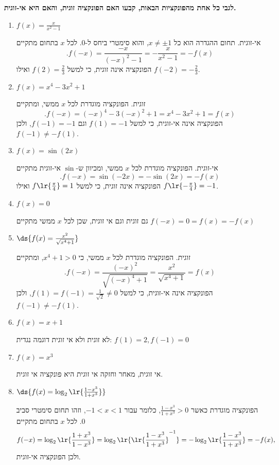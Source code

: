 \textbf{לגבי כל אחת מהפונקציות הבאות, קבעו האם הפונקציה זוגית, והאם היא אי-זוגית.}
\begin{enumerate}
\item $f(x) = \frac{x}{x^2 -1}$
\begin{solbox}
אי-זוגית. תחום ההגדרה הוא כל $x\neq\pm1$, והוא סימטרי ביחס ל-$0$. לכל $x$ בתחום מתקיים
$$.f(-x)=\frac{-x}{(-x)^2-1}=-\frac{x}{x^2-1}=-f(x)$$
הפונקציה אינה זוגית, כי למשל
$f(2)=\frac23$
ואילו
$f(-2)=-\frac23$.
\end{solbox}
\item $f(x) = x^4 - 3x^2 + 1$
\begin{solbox}
זוגית. הפונקציה מוגדרת לכל $x$ ממשי, ומתקיים
$$.f(-x)=(-x)^4-3(-x)^2+1=x^4-3x^2+1=f(x)$$
הפונקציה אינה אי-זוגית, כי למשל
$f(1)=-1$
וגם
$f(-1)=-1$,
ולכן
$f(-1)\neq -f(1)$.
\end{solbox}
\item $f(x) = \sin (2x)$
\begin{solbox}
אי-זוגית. הפונקציה מוגדרת לכל $x$ ממשי, ומכיוון ש-$\sin$ אי-זוגית מתקיים
$$.f(-x)=\sin(-2x)=-\sin(2x)=-f(x)$$
הפונקציה אינה זוגית, כי למשל
$f\lr{\frac\pi4}=1$
ואילו
$f\lr{-\frac\pi4}=-1$.
\end{solbox}
\item $f(x)=0$
\begin{solbox}
גם זוגית וגם אי זוגית, שכן לכל $x$ ממשי מתקיים
$f(-x) = 0 = f(x) = -f(x)$
\end{solbox}
\item  $\ds{f(x)=\frac{x^2}{\sqrt{x^4+1}}}$
\begin{solbox}
זוגית. הפונקציה מוגדרת לכל $x$ ממשי, כי $x^4+1>0$, ומתקיים
$$.f(-x)=\frac{(-x)^2}{\sqrt{(-x)^4+1}}=\frac{x^2}{\sqrt{x^4+1}}=f(x)$$
הפונקציה אינה אי-זוגית, כי למשל
$f(1)=f(-1)=\frac{1}{\sqrt2}\neq0$,
ולכן
$f(-1)\neq-f(1)$.
\end{solbox}
\item  $f(x)=x+1$
\begin{solbox}
לא זוגית ולא אי זוגית דוגמה נגדית:
$f(1)=2 , f(-1)=0$
\end{solbox}
\item  $f(x)=x^3$
\begin{solbox}
אי זוגית,
מאחר וחזקה אי זוגית היא פונקציה אי זוגית.
\end{solbox}
\item  $\ds{f(x)=\log_2\lr{\frac{1-x^3}{1+x^3}}}$
\begin{solbox}
הפונקציה מוגדרת כאשר
$\frac{1-x^3}{1+x^3}>0$,
כלומר עבור
$-1<x<1$,
וזהו תחום סימטרי סביב $0$.
לכל $x$ בתחום מתקיים
$$f(-x)=\log_2\lr{\frac{1+x^3}{1-x^3}}=\log_2\lr{\lr{\frac{1-x^3}{1+x^3}}^{-1}}=-\log_2\lr{\frac{1-x^3}{1+x^3}}=-f(x),$$
ולכן הפונקציה אי-זוגית.
\end{solbox}
\eMs
\end{enumerate}
